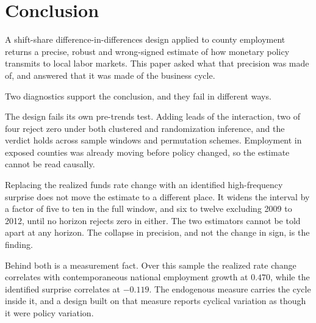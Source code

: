 %

\section{Conclusion}

A shift-share difference-in-differences design applied to county employment
returns a precise, robust and wrong-signed estimate of how monetary policy
transmits to local labor markets. This paper asked what that precision was made
of, and answered that it was made of the business cycle.

Two diagnostics support the conclusion, and they fail in different ways.

The design fails its own pre-trends test. Adding leads of the interaction, two
of four reject zero under both clustered and randomization inference, and the
verdict holds across sample windows and permutation schemes.
Employment in exposed counties was already moving before policy changed, so the
estimate cannot be read causally.

Replacing the realized funds rate change with an identified high-frequency
surprise does not move the estimate to a different place. It widens the interval
by a factor of five to ten in the full window, and six to twelve excluding
2009 to 2012, until no horizon rejects zero in either. The two estimators cannot
be told apart at any horizon. The collapse in precision, and not the change in
sign, is the finding.

Behind both is a measurement fact. Over this sample the realized rate change
correlates with contemporaneous national employment growth at $0.470$, while the
identified surprise correlates at $-0.119$. The endogenous measure carries the
cycle inside it, and a design built on that measure reports cyclical variation
as though it were policy variation.

